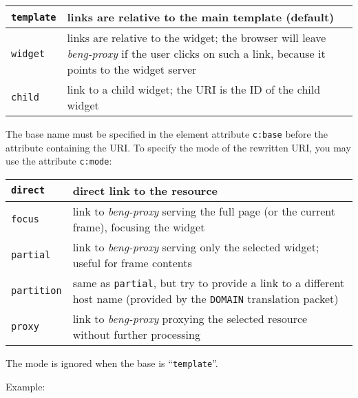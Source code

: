 \documentclass[a4paper,12pt]{article}
\begin{document}
\begin{tabular}{|l|p{10cm}|}
\hline

\texttt{template} & links are relative to the main template (default)
\\

\hline

\texttt{widget} & links are relative to the widget; the browser will
leave \emph{beng-proxy} if the user clicks on such a link, because it
points to the widget server \\

\hline

\texttt{child} & link to a child widget; the URI is the ID of the
child widget \\

\hline
\end{tabular}

The base name must be specified in the element attribute
\texttt{c:base} before the attribute containing the URI.  To specify
the mode of the rewritten URI, you may use the attribute
\texttt{c:mode}:

\begin{tabular}{|l|p{10cm}|}
\hline

\texttt{direct} & direct link to the resource \\

\hline

\texttt{focus} & link to \emph{beng-proxy} serving the full page (or
the current frame), focusing the widget \\

\hline

\texttt{partial} & link to \emph{beng-proxy} serving only the selected
widget; useful for frame contents \\

\hline

\texttt{partition} & same as \texttt{partial}, but try to provide a
link to a different host name (provided by the \texttt{DOMAIN}
translation packet) \\

\hline

\texttt{proxy} & link to \emph{beng-proxy} proxying the selected
resource without further processing \\

\hline
\end{tabular}

The mode is ignored when the base is ``\texttt{template}''.

Example:
\end{document}
